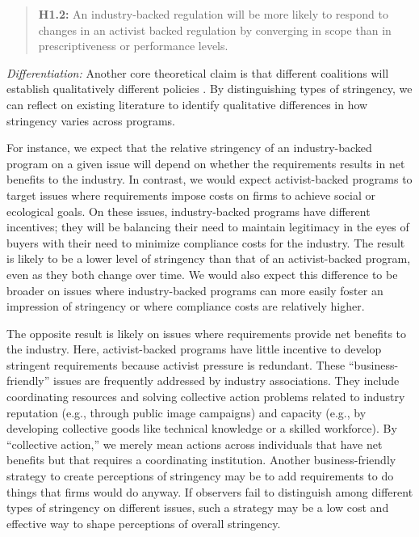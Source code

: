 \documentclass[
      12pt,
            Review ]{article}
\begin{document}
\begin{quote}
\textbf{H1.2:} An industry-backed regulation will be more likely to
respond to changes in an activist backed regulation by converging in
scope than in prescriptiveness or performance levels.
\end{quote}

\emph{Differentiation:} Another core theoretical claim is that different
coalitions will establish qualitatively different policies
\citep{Botzem2012, Hsueh2012}. By distinguishing types of stringency, we
can reflect on existing literature to identify qualitative differences
in how stringency varies across programs.

For instance, we expect that the relative stringency of an
industry-backed program on a given issue will depend on whether the
requirements results in net benefits to the industry. In contrast, we
would expect activist-backed programs to target issues where
requirements impose costs on firms to achieve social or ecological
goals. On these issues, industry-backed programs have different
incentives; they will be balancing their need to maintain legitimacy in
the eyes of buyers with their need to minimize compliance costs for the
industry. The result is likely to be a lower level of stringency than
that of an activist-backed program, even as they both change over time.
We would also expect this difference to be broader on issues where
industry-backed programs can more easily foster an impression of
stringency or where compliance costs are relatively higher.

The opposite result is likely on issues where requirements provide net
benefits to the industry. Here, activist-backed programs have little
incentive to develop stringent requirements because activist pressure is
redundant. These ``business-friendly'' issues are frequently addressed
by industry associations. They include coordinating resources and
solving collective action problems related to industry reputation (e.g.,
through public image campaigns) and capacity (e.g., by developing
collective goods like technical knowledge or a skilled workforce). By
``collective action,'' we merely mean actions across individuals that
have net benefits but that requires a coordinating institution. Another
business-friendly strategy to create perceptions of stringency may be to
add requirements to do things that firms would do anyway. If observers
fail to distinguish among different types of stringency on different
issues, such a strategy may be a low cost and effective way to shape
perceptions of overall stringency.
\end{document}
